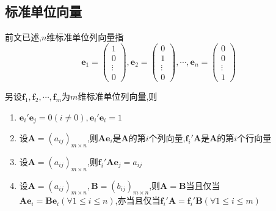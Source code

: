 \subsection{标准单位向量}
\begin{formal}
\begin{definition}[标准单位列向量]\label{def:标准单位列向量}
    前文已述,$n$维标准单位列向量指
\[
\bm{e}_1=\begin{pmatrix}
    1\\0\\\vdots\\0
\end{pmatrix},\bm{e}_2=\begin{pmatrix}
    0\\1\\\vdots\\0
\end{pmatrix},\cdots,\bm{e}_n=\begin{pmatrix}
    0\\0\\\vdots\\1
\end{pmatrix}
\]
\end{definition}
\end{formal}
\begin{formal}
\begin{proposition}[标准单位向量的性质]\label{prop:标准单位向量的性质}
另设$\bm{f}_1,\bm{f}_2,\cdots,\bm{f}_m$为$m$维标准单位列向量,则
\begin{enumerate}[label={\textup{(\arabic*)}}]
    \item $\bm{e}_i'\bm{e}_j =0\left(i\neq 0\right),\bm{e}_i'\bm{e}_i=1$
    \item 设$\bm{A}=\left(a_{ij}\right)_{m\times n}$,则$\bm{Ae}_i$是$\bm{A}$的第$i$个列向量,$\bm{f}_i'\bm{A}$是$\bm{A}$的第$i$个行向量
    \item 设$\bm{A}=\left(a_{ij}\right)_{m\times n}$,则$\bm{f}_i'\bm{A}\bm{e}_j=a_{ij}$
    \item 设$\bm{A}=\left(a_{ij}\right)_{m\times n},\bm{B}=\left(b_{ij}\right)_{m\times n}$,则$\bm{A}=\bm{B}$当且仅当$\bm{Ae}_i=\bm{Be}_i\left(\forall 1\leqslant i\leqslant n\right)$,亦当且仅当$\bm{f}_i'\bm{A}=\bm{f}_i'\bm{B}\left(\forall 1\leqslant i\leqslant m\right)$
\end{enumerate}
\end{proposition}
\end{formal}

